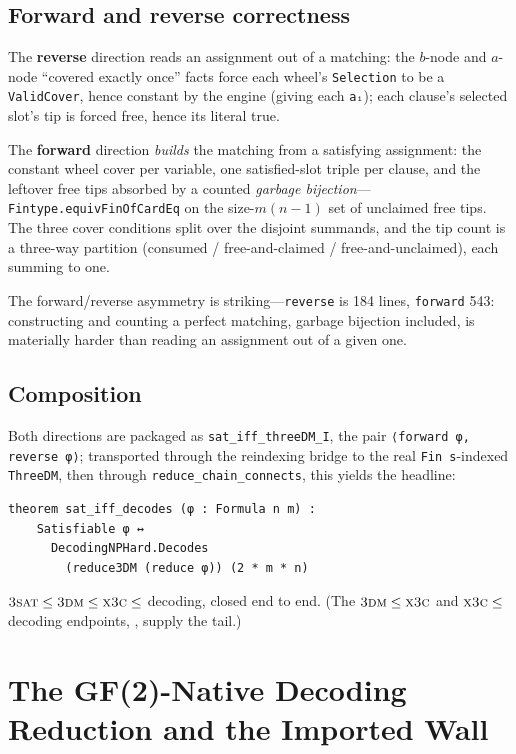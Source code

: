 \documentclass[sigplan,review,anonymous]{acmart}
\begin{document}
\subsection{Forward and reverse correctness}\label{sec:fwdrev}

The \textbf{reverse} direction reads an assignment out of a matching: the $b$-node and $a$-node ``covered
exactly once'' facts force each wheel's \lstinline{Selection} to be a \lstinline{ValidCover}, hence constant by
the engine (giving each \lstinline{aᵢ}); each clause's selected slot's tip is forced free, hence its literal
true.

The \textbf{forward} direction \emph{builds} the matching from a satisfying assignment: the constant wheel cover
per variable, one satisfied-slot triple per clause, and the leftover free tips absorbed by a counted
\emph{garbage bijection}---\lstinline{Fintype.equivFinOfCardEq} on the size-$m(n{-}1)$ set of unclaimed free
tips. The three cover conditions split over the disjoint summands, and the tip count is a three-way partition
(consumed / free-and-claimed / free-and-unclaimed), each summing to one.

The forward/reverse asymmetry is striking---\lstinline{reverse} is 184 lines, \lstinline{forward} 543:
constructing and counting a perfect matching, garbage bijection included, is materially harder than reading an
assignment out of a given one.

\subsection{Composition}\label{sec:compose}

Both directions are packaged as \lstinline{sat_iff_threeDM_I}, the pair \lstinline{⟨forward φ, reverse φ⟩};
transported through the reindexing bridge to the real \lstinline{Fin s}-indexed \lstinline{ThreeDM}, then
through \lstinline{reduce_chain_connects}, this yields the headline:
\begin{lstlisting}[style=leandisplay]
theorem sat_iff_decodes (φ : Formula n m) :
    Satisfiable φ ↔
      DecodingNPHard.Decodes
        (reduce3DM (reduce φ)) (2 * m * n)
\end{lstlisting}
$\textsc{3sat} \le \textsc{3dm} \le \textsc{x3c} \le$ decoding, closed end to end. (The
$\textsc{3dm} \le \textsc{x3c}$ and $\textsc{x3c} \le$ decoding endpoints, , supply the tail.)

\section{The GF(2)-Native Decoding Reduction and the Imported Wall}\label{sec:gf2}
\end{document}
